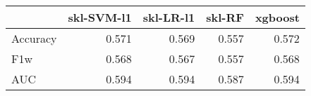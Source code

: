 \begin{tabular}{lrrrr}
\toprule
{} &  skl-SVM-l1 &  skl-LR-l1 &  skl-RF &  xgboost \\
\midrule
Accuracy &       0.571 &      0.569 &   0.557 &    0.572 \\
F1w      &       0.568 &      0.567 &   0.557 &    0.568 \\
AUC      &       0.594 &      0.594 &   0.587 &    0.594 \\
\bottomrule
\end{tabular}
